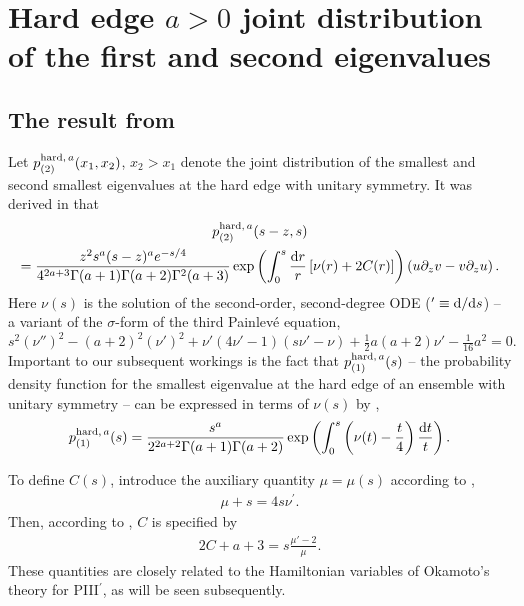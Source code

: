 \documentclass[10pt,reqno]{amsart}
\theoremstyle{plain}
\theoremstyle{definition}
\theoremstyle{remark}
\begin{document}
 
\section{\sc Hard edge $a>0$ joint distribution of the first and second eigenvalues}\label{S:HEdbn}
\setcounter{equation}{0}
\subsection{The result from {\bf \cite{FW_2007}}}
Let $p_{(2)}^{{\rm hard,} \, a} (x_1,x_2)$, $x_2>x_1$ denote the joint distribution of the smallest and second smallest eigenvalues at the 
hard edge with unitary symmetry. It was derived in \cite{FW_2007} that
\begin{multline}
 p_{(2)}^{{\rm hard,} \, a}(s-z,s)
\\
			= \frac{z^2 s^a (s-z)^a e^{-s/4}} {4^{2a+3} \Gamma(a+1) \Gamma(a+2) \Gamma^2(a+3) }
				\exp\left( \int_0^s \frac{{\rm d}r}{r}  \left[ \nu(r) + 2C(r) \right] \right) \left(u \partial_z v - v \partial_z u \right) .
\label{eq:1.16}
\end{multline}
Here $\nu(s)$ is the solution of the second-order, second-degree ODE (${}^\prime \equiv {\rm d}/{\rm d}s$) -- a variant of the $\sigma$-form of the third
Painlev\'e equation, \cite[Eq.~(5.25)]{FW_2007}
\begin{equation}
 s^2(\nu'')^2-(a+2)^2(\nu')^2+\nu'(4\nu'-1)(s \nu'-\nu)+\tfrac{1}{2}a(a+2)\nu'-\tfrac{1}{16}a^2 = 0 .   
\label{PIIIsigma}
\end{equation} 
Important to our subsequent workings is the fact that $p_{(1)}^{{\rm hard,} \, a}(s)$ -- the probability density function for the smallest eigenvalue
at the hard edge of an ensemble with unitary symmetry -- can be expressed in terms of $\nu(s)$ by \cite{FW_2002a}, \cite[Eq.~(8.93)]{rmt_Fo}
\begin{align}
p_{(1)}^{{\rm hard,} \, a}(s)  = \frac{s^a}{ 2^{2a+2} \Gamma(a+1)\Gamma(a+2) } \exp \left( \int_0^s \left( \nu(t) - \frac{t}{4} \right) 
		 \frac{ {\rm d}t} {t} \right).
\label{eq:x1}
\end{align}
 
To define $C(s)$, introduce the auxiliary quantity $\mu = \mu(s)$ according to \cite[Eq.~(5.25)]{FW_2007},
\begin{align}
 \mu + s = 4s \nu^{\prime}.
\label{HE_DEnu}
\end{align}
Then, according to \cite[Eq.~(5.20)]{FW_2007}, $C$ is specified by 
\begin{align}
   2C+a+3 = s\frac{{\mu'}-2}{\mu} .    
\label{HE_Crel}
\end{align}
These quantities are closely related to the Hamiltonian variables of Okamoto's theory for PIII$^{\prime}$, as will be seen
subsequently.
 
\end{document}

